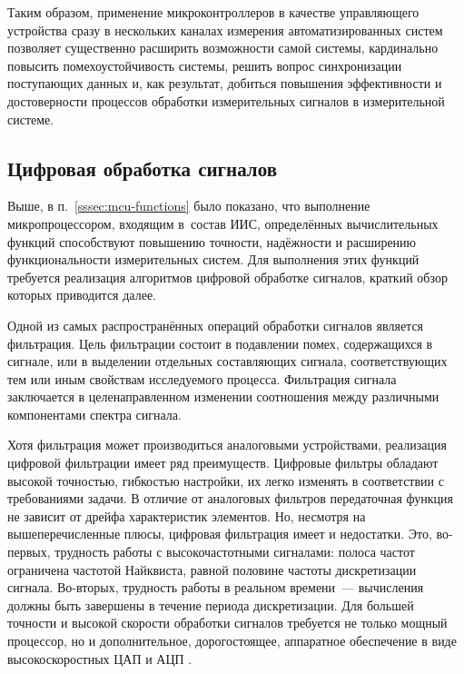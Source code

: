 \documentclass[a4paper, 14pt, titlepage]{extarticle}
\begin{document}
  Таким образом, применение микроконтроллеров в качестве управляющего устройства сразу в нескольких
  каналах измерения автоматизированных систем позволяет существенно расширить возможности самой
  системы, кардинально повысить помехоустойчивость системы, решить вопрос синхронизации поступающих
  данных и, как результат, добиться повышения эффективности и достоверности процессов обработки
  измерительных сигналов в измерительной системе.

  \subsection{Цифровая обработка сигналов}\label{ssec:signal-processing}


  Выше, в п.~\ref{sssec:mcu-functions} было показано, что выполнение микропроцессором, входящим
  в~состав ИИС, определённых вычислительных функций способствуют повышению точности, надёжности и
  расширению функциональности измерительных систем. Для выполнения этих функций требуется реализация
  алгоритмов цифровой обработке сигналов, краткий обзор которых приводится далее.

  Одной из самых распространённых операций обработки сигналов является фильтрация. Цель
  фильтрации состоит в подавлении помех, содержащихся в сигнале, или в выделении отдельных
  составляющих сигнала, соответствующих тем или иным свойствам исследуемого процесса. Фильтрация
  сигнала заключается в целенаправленном изменении соотношения между различными компонентами спектра
  сигнала.

  Хотя фильтрация может производиться аналоговыми устройствами, реализация цифровой фильтрации имеет
  ряд преимуществ. Цифровые фильтры обладают высокой точностью, гибкостью настройки, их легко
  изменять в соответствии с требованиями задачи. В отличие от аналоговых
  фильтров передаточная функция не зависит от дрейфа характеристик элементов. Но, несмотря на
  вышеперечисленные плюсы, цифровая фильтрация имеет и недостатки. Это, во-первых, трудность работы с
  высокочастотными сигналами: полоса частот ограничена частотой Найквиста, равной половине частоты
  дискретизации сигнала. Во-вторых, трудность работы в реальном времени~--- вычисления должны быть завершены в
  течение периода дискретизации. Для большей точности и высокой скорости обработки сигналов
  требуется не только мощный процессор, но и дополнительное, дорогостоящее, аппаратное обеспечение в
  виде высокоскоростных ЦАП и АЦП \cite{glinchenko-digital}.
\end{document}
